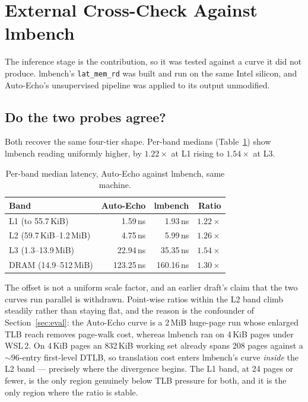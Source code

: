 \documentclass[conference]{IEEEtran}
\begin{document}
\section{External Cross-Check Against lmbench}
\label{app:lmbench}

The inference stage is the contribution, so it was tested against a curve it did
not produce. lmbench's \texttt{lat\_mem\_rd} \citep{mcvoy1996} was built and run
on the same Intel silicon, and Auto-Echo's unsupervised pipeline was applied to
its output unmodified.

\subsection{Do the two probes agree?}

Both recover the same four-tier shape. Per-band medians (Table~\ref{tab:lmbench})
show lmbench reading uniformly higher, by $1.22\times$ at L1 rising to
$1.54\times$ at L3.

\begin{table}[h]
\caption{Per-band median latency, Auto-Echo against lmbench, same machine.}
\label{tab:lmbench}
\centering
\footnotesize
\begin{tabular}{@{}lrrr@{}}
\toprule
\textbf{Band} & \textbf{Auto-Echo} & \textbf{lmbench} & \textbf{Ratio} \\
\midrule
L1 (to 55.7\,KiB)          & 1.59\,ns   & 1.93\,ns   & $1.22\times$ \\
L2 (59.7\,KiB--1.2\,MiB)   & 4.75\,ns   & 5.99\,ns   & $1.26\times$ \\
L3 (1.3--13.9\,MiB)        & 22.94\,ns  & 35.35\,ns  & $1.54\times$ \\
DRAM (14.9--512\,MiB)      & 123.25\,ns & 160.16\,ns & $1.30\times$ \\
\bottomrule
\end{tabular}
\end{table}

The offset is not a uniform scale factor, and an earlier draft's claim that the
two curves run parallel is withdrawn. Point-wise ratios within the L2 band climb
steadily rather than staying flat, and the reason is the confounder of
Section~\ref{sec:eval}: the Auto-Echo curve is a 2\,MiB huge-page run whose
enlarged TLB reach removes page-walk cost, whereas lmbench ran on 4\,KiB pages
under WSL\,2. On 4\,KiB pages an 832\,KiB working set already spans 208 pages
against a ${\sim}96$-entry first-level DTLB, so translation cost enters lmbench's
curve \emph{inside} the L2 band --- precisely where the divergence begins. The L1
band, at 24 pages or fewer, is the only region genuinely below TLB pressure for
both, and it is the only region where the ratio is stable.
\end{document}
